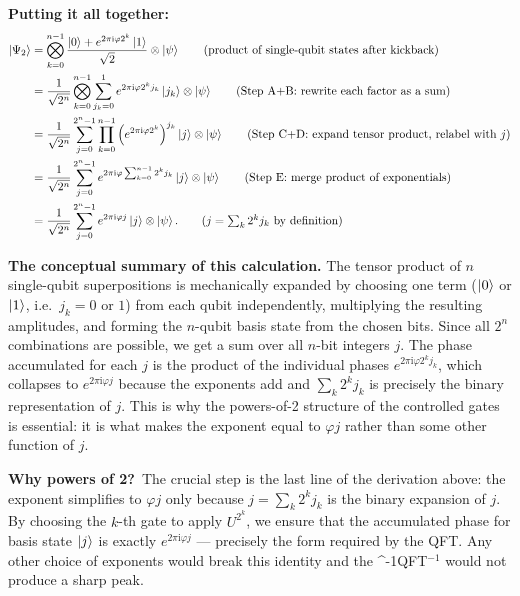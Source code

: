 \documentclass[12pt,a4paper]{article}
\newcommand{\IQFT}{\ifmmode \text{\textsc{QFT}}^{-1}\else \textsc{QFT}$^{-1}$\fi}
\newcommand{\ii}{\mathrm{i}}
\begin{document}
\medskip
\noindent\textbf{Putting it all together:}
\begin{align}
  \Ket{\Psi_2}
  &= \bigotimes_{k=0}^{n-1}\frac{\Ket{0}+e^{2\pi \ii \varphi 2^k}\Ket{1}}{\sqrt{2}}
  \otimes\Ket{\psi}
  \tag{product of single-qubit states after kickback} \\
  &= \frac{1}{\sqrt{2^n}} \bigotimes_{k=0}^{n-1} \sum_{j_k=0}^{1} e^{2\pi\ii\varphi 2^k j_k}\Ket{j_k}
  \otimes\Ket{\psi}
  \tag{Step A+B: rewrite each factor as a sum} \\
  &= \frac{1}{\sqrt{2^n}} \sum_{j=0}^{2^n-1}
      \prod_{k=0}^{n-1} \left(e^{2\pi \ii \varphi 2^k}\right)^{j_k} \Ket{j}
  \otimes\Ket{\psi}
  \tag{Step C+D: expand tensor product, relabel with $j$} \\
  &= \frac{1}{\sqrt{2^n}} \sum_{j=0}^{2^n-1}
      e^{2\pi \ii \varphi \sum_{k=0}^{n-1} 2^k j_k} \Ket{j}
  \otimes\Ket{\psi}
  \tag{Step E: merge product of exponentials} \\
  &= \frac{1}{\sqrt{2^n}} \sum_{j=0}^{2^n-1}
      e^{2\pi \ii \varphi j}\Ket{j}
  \otimes\Ket{\psi}.
  \tag{$j = \sum_k 2^k j_k$ by definition}
  \label{eq:after_controlled}
\end{align}

\begin{tcolorbox}[insight]
  \textbf{The conceptual summary of this calculation.}
  The tensor product of $n$ single-qubit superpositions is mechanically
  expanded by choosing one term ($\Ket{0}$ or $\Ket{1}$, i.e.\ $j_k=0$ or $1$)
  from each qubit independently, multiplying the resulting amplitudes, and
  forming the $n$-qubit basis state from the chosen bits.
  Since all $2^n$ combinations are possible, we get a sum over all
  $n$-bit integers $j$.  The phase accumulated for each $j$ is the product
  of the individual phases $e^{2\pi\ii\varphi 2^k j_k}$, which collapses
  to $e^{2\pi\ii\varphi j}$ because the exponents add and
  $\sum_k 2^k j_k$ is precisely the binary representation of $j$.
  This is why the powers-of-2 structure of the controlled gates
  is essential: it is what makes the exponent equal to $\varphi j$
  rather than some other function of $j$.
\end{tcolorbox}

\begin{tcolorbox}[insight]
  \textbf{Why powers of 2?}\ The crucial step is the last line of the
  derivation above: the exponent simplifies to $\varphi j$ only because
  $j = \sum_k 2^k j_k$ is the binary expansion of $j$.  By choosing the
  $k$-th gate to apply $U^{2^k}$, we ensure that the accumulated phase for
  basis state $\Ket{j}$ is exactly $e^{2\pi \ii \varphi j}$ — precisely
  the form required by the QFT.  Any other choice of exponents would break
  this identity and the \IQFT{} would not produce a sharp peak.
\end{tcolorbox}
\end{document}
